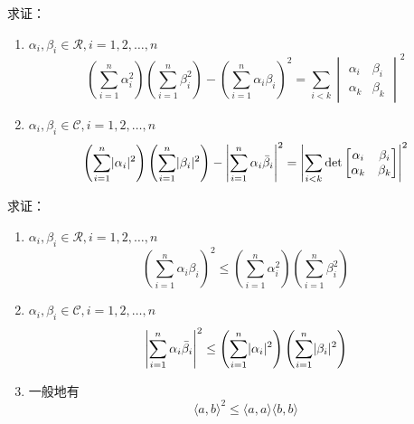 \documentclass[twoside,openright]{book}
\begin{document}
\begin{CJK*}{UTF8}{}
\begin{quest}
\label{quest:80}
\end{quest}

\begin{quest}
\label{quest:81}
\end{quest}

\begin{quest}
\label{quest:82}
\end{quest}

\begin{quest}
\label{quest:83}
\end{quest}

\begin{quest}
\label{quest:84}
\end{quest}

\begin{quest}
\label{quest:85}
\end{quest}

\begin{quest}
\label{quest:86}
求证：
\begin{enumerate}
\item
$\alpha_i,\beta_i\in\mathcal{R},i=1,2,\dotsc,n$
\[
\left(\sum_{i=1}^n\alpha_i^2\right)
\left(\sum_{i=1}^n\beta_i^2\right)-
\left(\sum_{i=1}^n\alpha_i\beta_i\right)^2=
\sum_{i<k}
\begin{vmatrix}
\alpha_i & \beta_i \\
\alpha_k & \beta_k
\end{vmatrix}^2
\]
\item
$\alpha_i,\beta_i\in\mathcal{C},i=1,2,\dotsc,n$
\[
\left(\sum_{i=1}^n\lvert{\alpha_i}\rvert^2\right)
\left(\sum_{i=1}^n\lvert{\beta_i}\rvert^2\right)-
\left|\sum_{i=1}^n\alpha_i\bar\beta_i\right|^2=
\left|\sum_{i<k}
\det
\begin{bmatrix}
\alpha_i & \beta_i \\
\alpha_k & \beta_k
\end{bmatrix}\right|^2
\]
\end{enumerate}
\end{quest}

\begin{quest}
\label{quest:87}
\end{quest}

\begin{quest}
\label{quest:88}
求证：
\begin{enumerate}
\item
$\alpha_i,\beta_i\in\mathcal{R},i=1,2,\dotsc,n$
\[
\left(\sum_{i=1}^n\alpha_i\beta_i\right)^2
\leq
\left(\sum_{i=1}^n\alpha_i^2\right)
\left(\sum_{i=1}^n\beta_i^2\right)
\]
\item
$\alpha_i,\beta_i\in\mathcal{C},i=1,2,\dotsc,n$
\[
\left|\sum_{i=1}^n\alpha_i\bar\beta_i\right|^2
\leq
\left(\sum_{i=1}^n\lvert{\alpha_i}\rvert^2\right)
\left(\sum_{i=1}^n\lvert{\beta_i}\rvert^2\right)
\]
\item
一般地有
\[
\langle a, b \rangle^2
\leq
\langle a, a \rangle
\langle b, b \rangle
\]
\end{enumerate}
\end{quest}


\end{CJK*}
\end{document}
